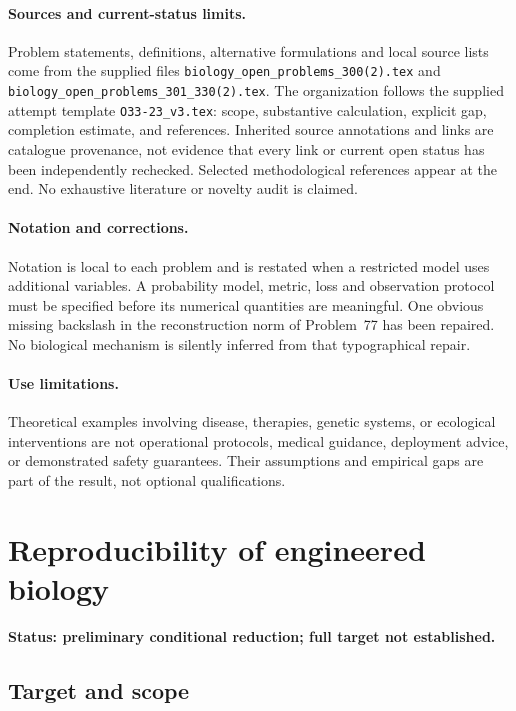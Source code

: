\documentclass[11pt]{article}
\begin{document}
\paragraph{Sources and current-status limits.}
Problem statements, definitions, alternative formulations and local source lists
come from the supplied files
\texttt{biology\_open\_problems\_300(2).tex} and
\texttt{biology\_open\_problems\_301\_330(2).tex}.
The organization follows the supplied attempt template
\texttt{O33-23\_v3.tex}: scope, substantive calculation, explicit gap,
completion estimate, and references. Inherited source annotations and links are
catalogue provenance, not evidence that every link or current open status has
been independently rechecked. Selected methodological references appear at the
end. No exhaustive literature or novelty audit is claimed.

\paragraph{Notation and corrections.}
Notation is local to each problem and is restated when a restricted model uses
additional variables. A probability model, metric, loss and observation protocol
must be specified before its numerical quantities are meaningful. One obvious
missing backslash in the reconstruction norm of Problem~77 has been repaired.
No biological mechanism is silently inferred from that typographical repair.

\paragraph{Use limitations.}
Theoretical examples involving disease, therapies, genetic systems, or ecological
interventions are not operational protocols, medical guidance, deployment advice,
or demonstrated safety guarantees. Their assumptions and empirical gaps are part
of the result, not optional qualifications.


\section*{Reproducibility of engineered biology}
\label{prob:279}
\noindent\textbf{Status: preliminary conditional reduction; full target not established.}
\subsection{Target and scope}
\end{document}
